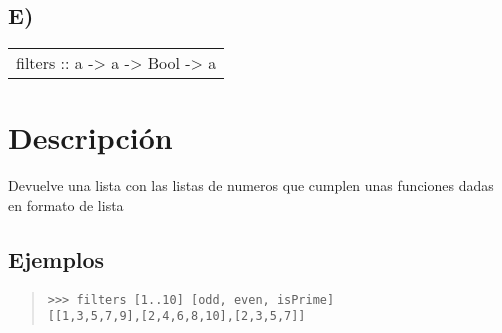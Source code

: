 \subsection{E)}
\begin{haddockdesc}
\item[\begin{tabular}{@{}l}
filters :: {\char 91}a{\char 93} -> {\char 91}a -> Bool{\char 93} -> {\char 91}{\char 91}a{\char 93}{\char 93}
\end{tabular}]
{\haddockbegindoc
\section*{Descripción}
Devuelve una lista con las listas de numeros que cumplen unas funciones dadas en formato de lista\par
\subsection*{Ejemplos}
\begin{quote}
{\haddockverb\begin{verbatim}
>>> filters [1..10] [odd, even, isPrime]
[[1,3,5,7,9],[2,4,6,8,10],[2,3,5,7]]

\end{verbatim}}
\end{quote}}
\end{haddockdesc}